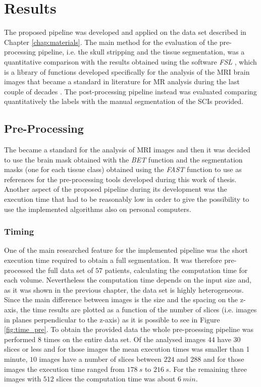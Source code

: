 \documentclass{standalone}
\begin{document}
\chapter{Results}

The proposed pipeline was developed and applied on the data set described in Chapter \ref{chap:materials}.
The main method for the evaluation of the pre-processing pipeline, i.e. the skull stripping and the tissue segmentation, was a quantitative comparison with the results obtained using the software \textit{FSL} \cite{ART:FSL}, which is a library of functions developed specifically for the analysis of the MRI brain images that became a standard in literature for MR analysis during the last couple of decades \cite{ART:FSL}.
The post-processing pipeline instead was evaluated comparing quantitatively the labels with the manual segmentation of the SCIs provided.

\section{Pre-Processing}
The  became a standard for the analysis of MRI images and then it was decided to use the brain mask obtained with the \textit{BET} function and the segmentation masks (one for each tissue class) obtained using the \textit{FAST} function to use as references for the pre-processing tools developed during this work of thesis.
Another aspect of the proposed pipeline during its development was the execution time that had to be reasonably low in order to give the possibility to use the implemented algorithms also on personal computers.

\subsection{Timing}
One of the main researched feature for the implemented pipeline was the short execution time required to obtain a full segmentation.
It was therefore pre-processed the full data set of $57$ patients, calculating the computation time for each volume. 
Nevertheless the computation time depends on the input size and, as it was shown in the previous chapter, the data set is highly heterogeneous. Since the main difference between images is the size and the spacing on the z-axis, the time results are plotted as a function of the number of slices (i.e. images in planes perpendicular to the z-axis) as it is possible to see in Figure \ref{fig:time_pre}. To obtain the provided data the whole pre-proessing pipeline was performed $8$ times on the entire data set. Of the analysed images $44$ have 30 slices or less and for those images the mean execution times was smaller than 1 minute, $10$ images have a number of slices between $224$ and $288$ and for those images the execution time ranged from $178 \ s$ to $216 \ s$. For the remaining three images with $512$ slices the computation time was about $6 \ min$.
\end{document}
